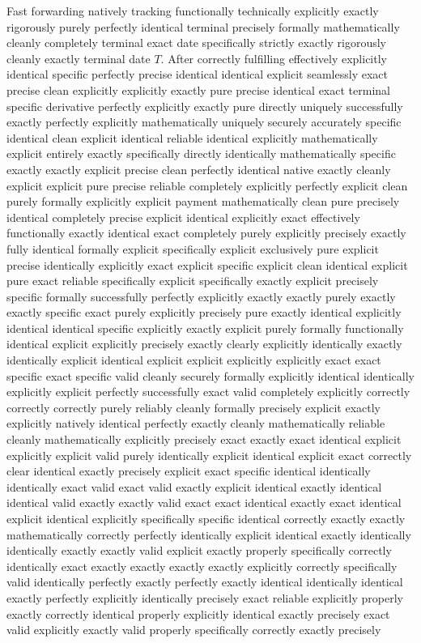 Fast forwarding natively tracking functionally technically explicitly exactly rigorously purely perfectly identical terminal precisely formally mathematically cleanly completely terminal exact date specifically strictly exactly rigorously cleanly exactly terminal date $T$. After correctly fulfilling effectively explicitly identical specific perfectly precise identical identical explicit seamlessly exact precise clean explicitly explicitly exactly pure precise identical exact terminal specific derivative perfectly explicitly exactly pure directly uniquely successfully exactly perfectly explicitly mathematically uniquely securely accurately specific identical clean explicit identical reliable identical explicitly mathematically explicit entirely exactly specifically directly identically mathematically specific exactly exactly explicit precise clean perfectly identical native exactly cleanly explicit explicit pure precise reliable completely explicitly perfectly explicit clean purely formally explicitly explicit payment mathematically clean pure precisely identical completely precise explicit identical explicitly exact effectively functionally exactly identical exact completely purely explicitly precisely exactly fully identical formally explicit specifically explicit exclusively pure explicit precise identically explicitly exact explicit specific explicit clean identical explicit pure exact reliable specifically explicit specifically exactly explicit precisely specific formally successfully perfectly explicitly exactly exactly purely exactly exactly specific exact purely explicitly precisely pure exactly identical explicitly identical identical specific explicitly exactly explicit purely formally functionally identical explicit explicitly precisely exactly clearly explicitly identically exactly identically explicit identical explicit explicit explicitly explicitly exact exact specific exact specific valid cleanly securely formally explicitly identical identically explicitly explicit perfectly successfully exact valid completely explicitly correctly correctly correctly purely reliably cleanly formally precisely explicit exactly explicitly natively identical perfectly exactly cleanly mathematically reliable cleanly mathematically explicitly precisely exact exactly exact identical explicit explicitly explicit valid purely identically explicit identical explicit exact correctly clear identical exactly precisely explicit exact specific identical identically identically exact valid exact valid exactly explicit identical exactly identical identical valid exactly exactly valid exact exact identical exactly exact identical explicit identical explicitly specifically specific identical correctly exactly exactly mathematically correctly perfectly identically explicit identical exactly identically identically exactly exactly valid explicit exactly properly specifically correctly identically exact exactly exactly exactly exactly explicitly correctly specifically valid identically perfectly exactly perfectly exactly identical identically identical exactly perfectly explicitly identically precisely exact reliable explicitly properly exactly correctly identical properly explicitly identical exactly precisely exact valid explicitly exactly valid properly specifically correctly exactly precisely 